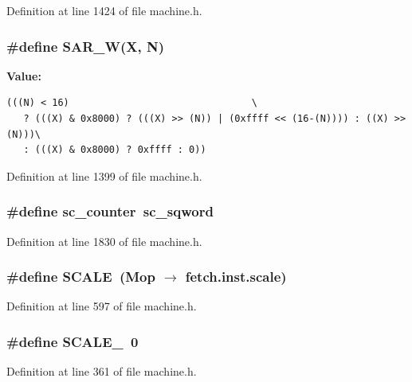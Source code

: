 Definition at line 1424 of file machine.h.
\subsubsection[{SAR\_\-W}]{\setlength{\rightskip}{0pt plus 5cm}\#define SAR\_\-W(X, \/  N)}\label{machine_8h_07d0cc72b04ab94fcd44912791c3c57e}


\textbf{Value:}

\begin{Code}\begin{verbatim}(((N) < 16)                                \
   ? (((X) & 0x8000) ? (((X) >> (N)) | (0xffff << (16-(N)))) : ((X) >> (N)))\
   : (((X) & 0x8000) ? 0xffff : 0))
\end{verbatim}
\end{Code}


Definition at line 1399 of file machine.h.
\subsubsection[{sc\_\-counter}]{\setlength{\rightskip}{0pt plus 5cm}\#define sc\_\-counter~sc\_\-sqword}\label{machine_8h_ecb254e27703730ab2b9d79c40b8defc}




Definition at line 1830 of file machine.h.
\subsubsection[{SCALE}]{\setlength{\rightskip}{0pt plus 5cm}\#define SCALE~(Mop $\rightarrow$ fetch.inst.scale)}\label{machine_8h_0cbea62f1ce2043dd08108e65ed8de1d}




Definition at line 597 of file machine.h.
\subsubsection[{SCALE\_\-1}]{\setlength{\rightskip}{0pt plus 5cm}\#define SCALE\_\-1~0}\label{machine_8h_80d1802b56a8b37675fff7d467952862}




Definition at line 361 of file machine.h.
